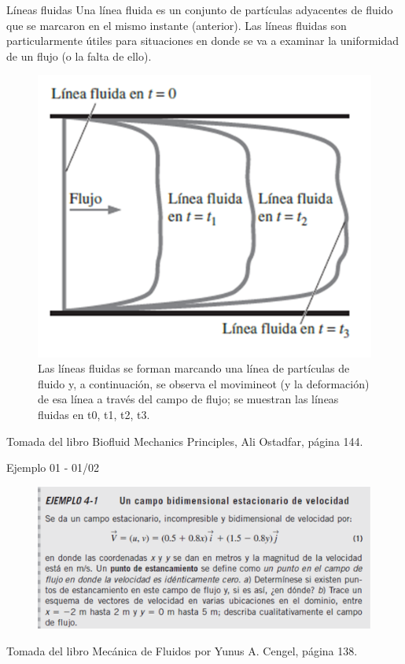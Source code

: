\begin{frame}{Líneas fluidas}
\justifying
Una línea fluida es un conjunto de partículas adyacentes de fluido que se marcaron en el mismo instante (anterior).
Las líneas fluidas son particularmente útiles para situaciones en donde se va a examinar la uniformidad de un flujo (o la falta de ello).
\begin{figure}[H]
\centering
\includegraphics[scale=0.4]{Section_Files/picmanuel/12.png}
\caption{Las líneas fluidas se forman marcando una línea de partículas de fluido y, a continuación, se observa el movimineot (y la deformación) de esa línea a través del campo de flujo; se muestran las líneas fluidas en t0, t1, t2, t3.}
\label{fig: Figura2-Fig0403-07}
\end{figure}	
{\tiny Tomada del libro Biofluid Mechanics Principles, Ali Ostadfar, página 144.}
\end{frame}

\begin{frame}{Ejemplo 01 - 01/02}
\justifying
\begin{figure}[H]
\centering
\includegraphics[scale=0.6]{Section_Files/picmanuel/13.png}
\label{fig: Figura2-Fig0403-08}
\end{figure}	
{\tiny Tomada del libro Mecánica de Fluidos por Yunus A. Cengel, página 138.}
\end{frame}

